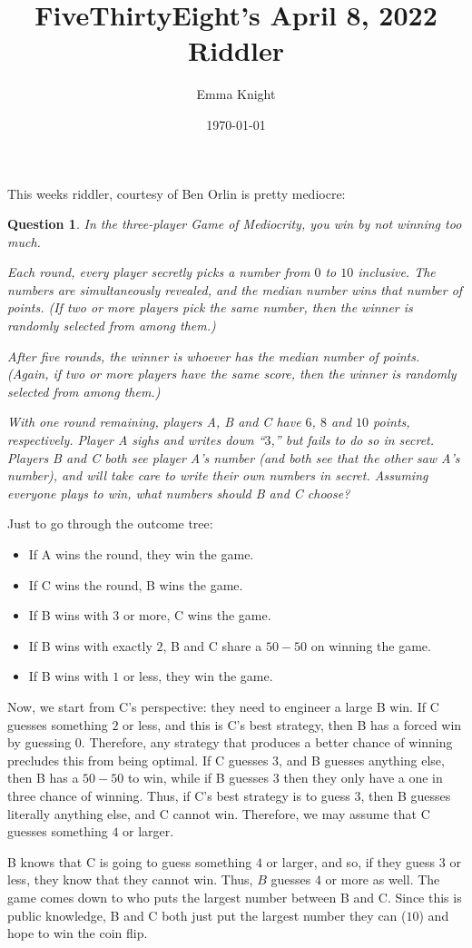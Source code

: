 \documentclass[11pt]{article}
\title{FiveThirtyEight's April 8, 2022 Riddler}
\author{Emma Knight}
\date{\today}
\newtheorem{question}[theorem]{Question}
\theoremstyle{definition}
\begin{document}
\maketitle
This weeks riddler, courtesy of Ben Orlin is pretty mediocre:
\begin{question}
In the three-player Game of Mediocrity, you win by not winning too much.

Each round, every player secretly picks a number from $0$ to $10$ inclusive. The numbers are simultaneously revealed, and the median number wins that number of points. (If two or more players pick the same number, then the winner is randomly selected from among them.)

After five rounds, the winner is whoever has the median number of points. (Again, if two or more players have the same score, then the winner is randomly selected from among them.)

With one round remaining, players A, B and C have $6$, $8$ and $10$ points, respectively. Player A sighs and writes down ``$3$,'' but fails to do so in secret. Players B and C both see player A’s number (and both see that the other saw A’s number), and will take care to write their own numbers in secret. Assuming everyone plays to win, what numbers should B and C choose?
\end{question}

Just to go through the outcome tree:
\begin{itemize}
\item If A wins the round, they win the game.
\item If C wins the round, B wins the game.
\item If B wins with $3$ or more, C wins the game.
\item If B wins with exactly $2$, B and C share a $50-50$ on winning the game.
\item If B wins with $1$ or less, they win the game.
\end{itemize}

Now, we start from C's perspective: they need to engineer a large B win.  If C guesses something $2$ or less, and this is C's best strategy, then B has a forced win by guessing $0$.  Therefore, any strategy that produces a better chance of winning precludes this from being optimal.  If C guesses $3$, and B guesses anything else, then B has a $50-50$ to win, while if B guesses $3$ then they only have a one in three chance of winning.  Thus, if C's best strategy is to guess $3$, then B guesses literally anything else, and C cannot win.  Therefore, we may assume that C guesses something $4$ or larger.

B knows that C is going to guess something $4$ or larger, and so, if they guess $3$ or less, they know that they cannot win.  Thus, $B$ guesses $4$ or more as well.  The game comes down to who puts the largest number between B and C.  Since this is public knowledge, B and C both just put the largest number they can ($10$) and hope to win the coin flip.
\end{document}
